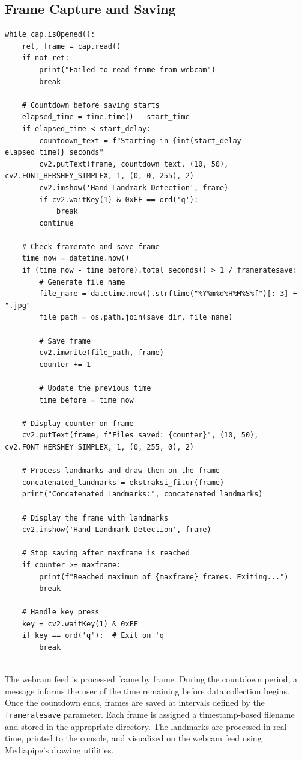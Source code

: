 \subsection{Frame Capture and Saving}
\begin{lstlisting}
while cap.isOpened():
	ret, frame = cap.read()
	if not ret:
		print("Failed to read frame from webcam")
		break
	
	# Countdown before saving starts
	elapsed_time = time.time() - start_time
	if elapsed_time < start_delay:
		countdown_text = f"Starting in {int(start_delay - elapsed_time)} seconds"
		cv2.putText(frame, countdown_text, (10, 50), cv2.FONT_HERSHEY_SIMPLEX, 1, (0, 0, 255), 2)
		cv2.imshow('Hand Landmark Detection', frame)
		if cv2.waitKey(1) & 0xFF == ord('q'):
			break
		continue
	
	# Check framerate and save frame
	time_now = datetime.now()
	if (time_now - time_before).total_seconds() > 1 / frameratesave:
		# Generate file name
		file_name = datetime.now().strftime("%Y%m%d%H%M%S%f")[:-3] + ".jpg"
		file_path = os.path.join(save_dir, file_name)
		
		# Save frame
		cv2.imwrite(file_path, frame)
		counter += 1
	
		# Update the previous time
		time_before = time_now
	
	# Display counter on frame
	cv2.putText(frame, f"Files saved: {counter}", (10, 50), cv2.FONT_HERSHEY_SIMPLEX, 1, (0, 255, 0), 2)
	
	# Process landmarks and draw them on the frame
	concatenated_landmarks = ekstraksi_fitur(frame)
	print("Concatenated Landmarks:", concatenated_landmarks)
	
	# Display the frame with landmarks
	cv2.imshow('Hand Landmark Detection', frame)
	
	# Stop saving after maxframe is reached
	if counter >= maxframe:
		print(f"Reached maximum of {maxframe} frames. Exiting...")
		break
	
	# Handle key press
	key = cv2.waitKey(1) & 0xFF
	if key == ord('q'):  # Exit on 'q'
		break
	

\end{lstlisting}

The webcam feed is processed frame by frame. During the countdown period, a message informs the user of the time remaining before data collection begins. Once the countdown ends, frames are saved at intervals defined by the \verb|frameratesave| parameter. Each frame is assigned a timestamp-based filename and stored in the appropriate directory. The landmarks are processed in real-time, printed to the console, and visualized on the webcam feed using Mediapipe’s drawing utilities.

